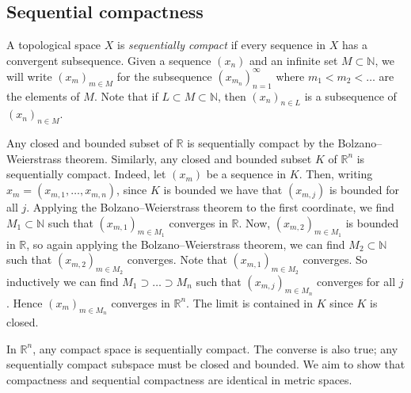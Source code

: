 \subsection{Sequential compactness}
\begin{definition}
	A topological space \( X \) is \textit{sequentially compact} if every sequence in \( X \) has a convergent subsequence.
	Given a sequence \( (x_n) \) and an infinite set \( M \subset \mathbb N \), we will write \( (x_m)_{m \in M} \) for the subsequence \( (x_{m_n})_{n=1}^\infty \) where \( m_1 < m_2 < \dots \) are the elements of \( M \).
	Note that if \( L \subset M \subset \mathbb N \), then \( (x_n)_{n \in L} \) is a subsequence of \( (x_n)_{n \in M} \).
\end{definition}
\begin{example}
	Any closed and bounded subset of \( \mathbb R \) is sequentially compact by the Bolzano--Weierstrass theorem.
	Similarly, any closed and bounded subset \( K \) of \( \mathbb R^n \) is sequentially compact.
	Indeed, let \( (x_m) \) be a sequence in \( K \).
	Then, writing \( x_m = (x_{m,1}, \dots, x_{m,n}) \), since \( K \) is bounded we have that \( (x_{m,j}) \) is bounded for all \( j \).
	Applying the Bolzano--Weierstrass theorem to the first coordinate, we find \( M_1 \subset \mathbb N \) such that \( (x_{m,1})_{m \in M_1} \) converges in \( \mathbb R \).
	Now, \( (x_{m,2})_{m \in M_1} \) is bounded in \( \mathbb R \), so again applying the Bolzano--Weierstrass theorem, we can find \( M_2 \subset \mathbb N \) such that \( (x_{m,2})_{m \in M_2} \) converges.
	Note that \( (x_{m,1})_{m \in M_2} \) converges.
	So inductively we can find \( M_1 \supset \dots \supset M_n \) such that \( (x_{m,j})_{m \in M_n} \) converges for all \( j \).
	Hence \( (x_m)_{m \in M_n} \) converges in \( \mathbb R^n \).
	The limit is contained in \( K \) since \( K \) is closed.
\end{example}
\begin{remark}
	In \( \mathbb R^n \), any compact space is sequentially compact.
	The converse is also true; any sequentially compact subspace must be closed and bounded.
	We aim to show that compactness and sequential compactness are identical in metric spaces.
\end{remark}

